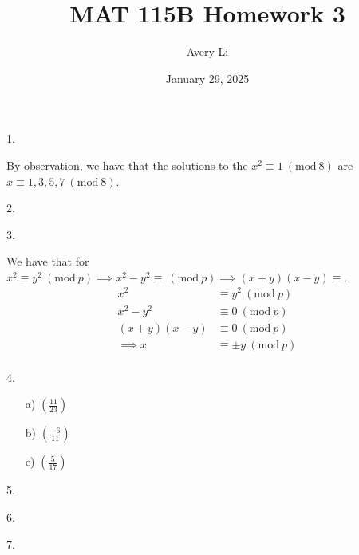 \documentclass[11pt]{article}
\title{MAT 115B Homework 3}
\author{Avery Li}
\date{January 29, 2025}
\newcommand{\legendre}[2]{\ensuremath{\left( \frac{#1}{#2} \right) }}
\newcommand{\Mod}[1]{\ (\mathrm{mod}\ #1)}
\begin{document}
\maketitle


\begin{flushleft}
1.
\end{flushleft}

By observation, we have that the solutions to the $x^2\equiv 1\Mod 8$ are $x\equiv 1, 3, 5, 7\Mod 8$.

\begin{flushleft}
2.
\end{flushleft}

\begin{flushleft}
3.
\end{flushleft}
We have that for $x^2\equiv y^2\Mod{p}\implies x^2-y^2\equiv\Mod{p}\implies (x+y)(x-y)\equiv $.
\begin{align*}
    x^2&\equiv y^2\Mod{p} \\
    x^2-y^2&\equiv 0 \Mod{p} \\
    (x+y)(x-y)&\equiv 0\Mod{p} \\
    \implies x&\equiv \pm y \Mod{p} \\
\end{align*}

\begin{flushleft}
4.

\begin{itemize}
    \item[ a) ]
    \legendre{11}{23}
    \item[ b) ]
    \legendre{-6}{11}
    \item[ c) ]
    \legendre{5}{17}
\end{itemize}

\end{flushleft}

\begin{flushleft}
5.
\end{flushleft}

\begin{flushleft}
6.
\end{flushleft}

\begin{flushleft}
7.
\end{flushleft}
\end{document}
